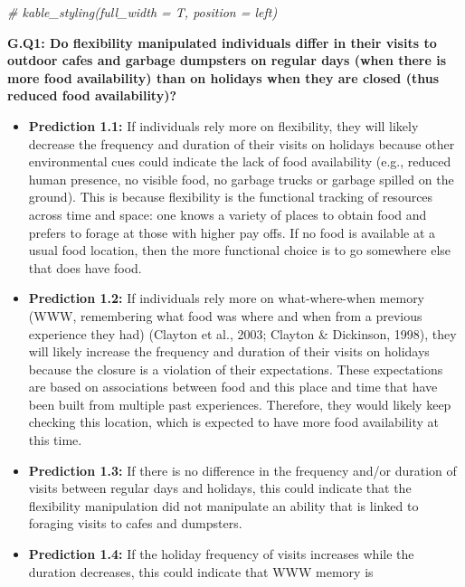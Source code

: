 \documentclass[
]{article}
\newenvironment{Shaded}{\begin{snugshade}}{\end{snugshade}}
\newcommand{\CommentTok}[1]{\textcolor[rgb]{0.56,0.35,0.01}{\textit{#1}}}
\providecommand{\tightlist}{%
  \setlength{\itemsep}{0pt}\setlength{\parskip}{0pt}}
\begin{document}
\begin{Shaded}
\begin{Highlighting}[]
\CommentTok{\# kable\_styling(full\_width = T, position = \textquotesingle{}left\textquotesingle{})}
\end{Highlighting}
\end{Shaded}

\textbf{G.Q1: Do flexibility manipulated individuals differ in their
visits to outdoor cafes and garbage dumpsters on regular days (when
there is more food availability) than on holidays when they are closed
(thus reduced food availability)?}

\begin{itemize}
\tightlist
\item
  \textbf{Prediction 1.1:} If individuals rely more on flexibility, they
  will likely decrease the frequency and duration of their visits on
  holidays because other environmental cues could indicate the lack of
  food availability (e.g., reduced human presence, no visible food, no
  garbage trucks or garbage spilled on the ground). This is because
  flexibility is the functional tracking of resources across time and
  space: one knows a variety of places to obtain food and prefers to
  forage at those with higher pay offs. If no food is available at a
  usual food location, then the more functional choice is to go
  somewhere else that does have food.
\item
  \textbf{Prediction 1.2:} If individuals rely more on what-where-when
  memory (WWW, remembering what food was where and when from a previous
  experience they had) (Clayton et al., 2003; Clayton \& Dickinson,
  1998), they will likely increase the frequency and duration of their
  visits on holidays because the closure is a violation of their
  expectations. These expectations are based on associations between
  food and this place and time that have been built from multiple past
  experiences. Therefore, they would likely keep checking this location,
  which is expected to have more food availability at this time.
\item
  \textbf{Prediction 1.3:} If there is no difference in the frequency
  and/or duration of visits between regular days and holidays, this
  could indicate that the flexibility manipulation did not manipulate an
  ability that is linked to foraging visits to cafes and dumpsters.
\item
  \textbf{Prediction 1.4:} If the holiday frequency of visits increases
  while the duration decreases, this could indicate that WWW memory is

\end{itemize}
\end{document}
